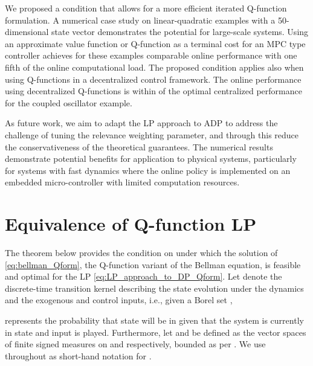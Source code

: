 \documentclass[journal]{IEEEtran}
\newcommand{\textQ}{Q}
\begin{document}
We proposed a condition that allows for a more efficient iterated \textQ-function formulation. A numerical case study on linear-quadratic examples with a 50-dimensional state vector demonstrates the potential for large-scale systems.
Using an approximate value function or \textQ-function as a terminal cost for an MPC type controller achieves for these examples comparable online performance with one fifth of the online computational load.
The proposed condition applies also when using \textQ-functions in a decentralized control framework. The online performance using decentralized \textQ-functions is within  of the optimal centralized performance for the coupled oscillator example.


As future work, we aim to adapt the LP approach to ADP to address the challenge of tuning the relevance weighting parameter, and through this reduce the conservativeness of the theoretical guarantees.
The numerical results demonstrate potential benefits for application to physical systems, particularly for systems with fast dynamics where the online policy is implemented on an embedded micro-controller with limited computation resources. 


\appendices











\section{Equivalence of \textQ-function LP} \label{app:LPequiv_Qform}

The theorem below provides the condition on  under which the solution of  \eqref{eq:bellman_Qform}, the \textQ-function variant of the Bellman equation, is feasible and optimal for the LP \eqref{eq:LP_approach_to_DP_Qform}.
Let  denote the discrete-time transition kernel describing the state evolution under the dynamics and the exogenous and control inputs, i.e., given a Borel set ,
	
represents the probability that state  will be in  given that the system is currently in state  and input  is played.
Furthermore, let  and  be defined as the vector spaces of finite signed measures on  and  respectively, bounded as per \cite[Definition 6.3.2, 6.3.4]{hernandez_2012_discreteTimeMCP}.
We use  throughout as short-hand notation for .
\end{document}
